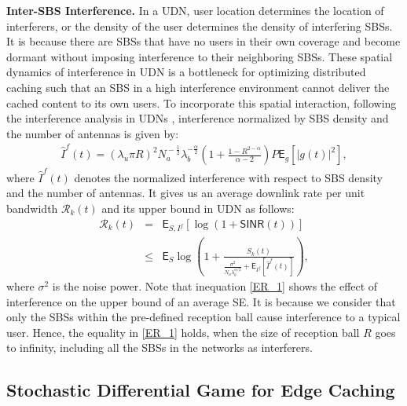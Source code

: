 \documentclass{book}
\begin{document}
    \textbf{Inter-SBS Interference.}\quad
    In a UDN, user location determines the  location of interferers, or the density of the user determines the density of interfering SBSs. It is because there are SBSs that have no users in their own coverage and become dormant without imposing interference to their neighboring SBSs. 
    These spatial dynamics of interference in UDN is a bottleneck for optimizing distributed caching such that an SBS in a high interference environment cannot deliver the cached content to its own users. 
    To incorporate this spatial interaction, following the interference analysis in UDNs \cite{JHP1}, interference normalized by SBS density and the number of antennas is given by: 
    \begin{align}
    \hat{I}^f\!(t)\!=\!(\lambda_u\pi R)^2 N_a^{\!-\frac{1}{2}}\lambda_b^{-\frac{\alpha}{2}}\! \left(\!1\!+\! \frac{1-R^{2-\alpha}}{\alpha-2}\! \right)\!{P}\mathsf{E}_g [|g(t)|^2], \label{interaction_2}
    \end{align}
    where $\hat{I}^f(t)$ denotes the normalized interference with respect to SBS density and the number of antennas.
    It gives us an average downlink rate per unit bandwidth $\mathcal{R}_k(t)$ and its upper bound in UDN as follows:
    \begin{eqnarray}
    \mathcal{R}_k(t)&=&\mathsf{E}_{S,I^f}\left[\log(1+\mathsf{SINR}(t))\right] \\ &\leq& \mathsf{E}_{S}\log\left(1+\frac{S_k(t)}{\frac{\sigma^2}{ N_a \lambda_b^{\alpha /2}} + \mathsf{E}_{I^f}[{\hat{I}}^f(t)]}\right), \label{ER_1}
    \end{eqnarray}
    \noindent where $\sigma^2$ is the noise power. Note that inequation \eqref{ER_1}  shows the effect of interference on the upper bound of an average SE. It is because we consider that only the SBSs within the pre-defined reception ball cause interference to a typical user. Hence, the equality in \eqref{ER_1} holds, when the size of reception ball $R$ goes to infinity, including all the SBSs in the networks as interferers. 
     
    
    
    \subsection{Stochastic Differential Game for  Edge Caching}
    
\end{document}
